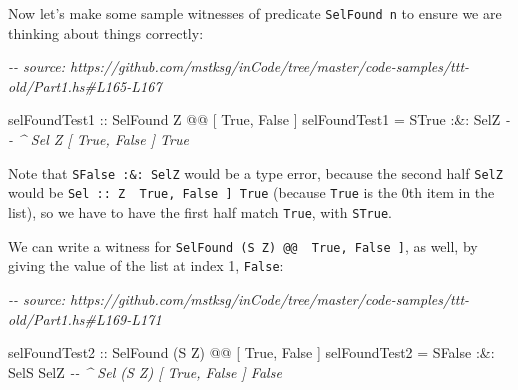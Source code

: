 \documentclass[]{article}
\newenvironment{Shaded}{}{}
\newcommand{\CommentTok}[1]{\textcolor[rgb]{0.38,0.63,0.69}{\textit{#1}}}
\newcommand{\DataTypeTok}[1]{\textcolor[rgb]{0.56,0.13,0.00}{#1}}
\newcommand{\NormalTok}[1]{#1}
\newcommand{\OperatorTok}[1]{\textcolor[rgb]{0.40,0.40,0.40}{#1}}
\newcommand{\OtherTok}[1]{\textcolor[rgb]{0.00,0.44,0.13}{#1}}
\begin{document}
Now let's make some sample witnesses of predicate \texttt{SelFound\ n} to ensure
we are thinking about things correctly:

\begin{Shaded}
\begin{Highlighting}[]
\CommentTok{{-}{-} source: https://github.com/mstksg/inCode/tree/master/code{-}samples/ttt{-}old/Part1.hs\#L165{-}L167}

\OtherTok{selFoundTest1 ::} \DataTypeTok{SelFound} \DataTypeTok{\textquotesingle{}Z} \OperatorTok{@@}\NormalTok{ \textquotesingle{}[ }\DataTypeTok{\textquotesingle{}True}\NormalTok{, }\DataTypeTok{\textquotesingle{}False}\NormalTok{ ]}
\NormalTok{selFoundTest1 }\OtherTok{=} \DataTypeTok{STrue} \OperatorTok{:\&:} \DataTypeTok{SelZ}
                       \CommentTok{{-}{-} \^{} Sel \textquotesingle{}Z \textquotesingle{}[ \textquotesingle{}True, \textquotesingle{}False ] \textquotesingle{}True}
\end{Highlighting}
\end{Shaded}

Note that \texttt{SFalse\ :\&:\ SelZ} would be a type error, because the second
half \texttt{SelZ} would be
\texttt{Sel\ ::\ \textquotesingle{}Z\ \textquotesingle{}{[}\ \textquotesingle{}True,\ \textquotesingle{}False\ {]}\ \textquotesingle{}True}
(because \texttt{\textquotesingle{}True} is the 0th item in the list), so we
have to have the first half match \texttt{\textquotesingle{}True}, with
\texttt{STrue}.

We can write a witness for
\texttt{SelFound\ (\textquotesingle{}S\ \textquotesingle{}Z)\ @@\ \textquotesingle{}{[}\ \textquotesingle{}True,\ \textquotesingle{}False\ {]}},
as well, by giving the value of the list at index 1,
\texttt{\textquotesingle{}False}:

\begin{Shaded}
\begin{Highlighting}[]
\CommentTok{{-}{-} source: https://github.com/mstksg/inCode/tree/master/code{-}samples/ttt{-}old/Part1.hs\#L169{-}L171}

\OtherTok{selFoundTest2 ::} \DataTypeTok{SelFound}\NormalTok{ (}\DataTypeTok{\textquotesingle{}S} \DataTypeTok{\textquotesingle{}Z}\NormalTok{) }\OperatorTok{@@}\NormalTok{ \textquotesingle{}[ }\DataTypeTok{\textquotesingle{}True}\NormalTok{, }\DataTypeTok{\textquotesingle{}False}\NormalTok{ ]}
\NormalTok{selFoundTest2 }\OtherTok{=} \DataTypeTok{SFalse} \OperatorTok{:\&:} \DataTypeTok{SelS} \DataTypeTok{SelZ}
                        \CommentTok{{-}{-} \^{} Sel (\textquotesingle{}S \textquotesingle{}Z) \textquotesingle{}[ \textquotesingle{}True, \textquotesingle{}False ] \textquotesingle{}False}
\end{Highlighting}
\end{Shaded}
\end{document}
